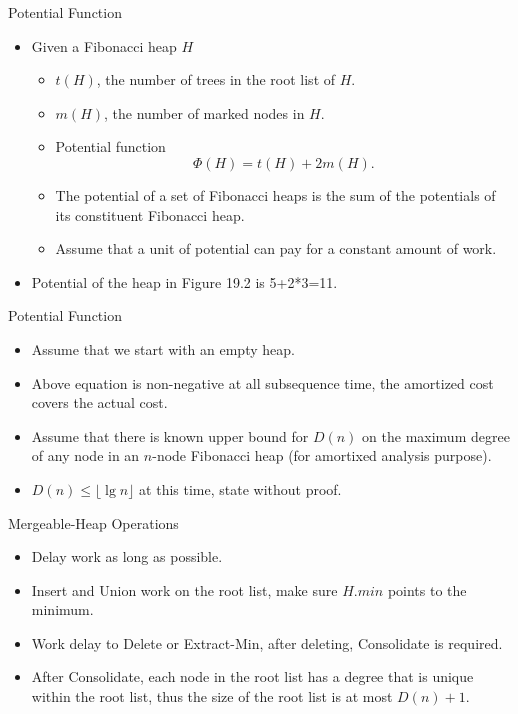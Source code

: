 \documentclass{beamer}
\begin{document}
\begin{frame}{Potential Function}
\begin{itemize}
\item Given a Fibonacci heap $H$
\begin{itemize}
\item $t(H)$, the number of trees in the root list of $H$.
\item $m(H)$, the number of marked nodes in $H$. 
\item Potential function \begin{equation}\Phi(H)=t(H)+2m(H). \label{1}\end{equation}
\item The potential of a set of Fibonacci heaps is the sum of the potentials of its constituent Fibonacci heap. 
\item Assume that a unit of potential can pay for a constant amount of work. 
\end{itemize}
\item Potential of the heap in Figure 19.2 is 5+2*3=11. 
\end{itemize}
\end{frame} 

\begin{frame}{Potential Function}
\vspace{0.5cm}
\begin{itemize}
\item Assume that we start with an empty heap.
\item Above equation is non-negative at all subsequence time, the amortized cost covers the actual cost. 
\item Assume that there is known upper bound for $D(n)$ on the maximum degree of any node in an $n$-node
Fibonacci heap (for amortixed analysis purpose). 
\item  $D(n)\le \lfloor \lg n\rfloor$ at this time, state without proof. 
\end{itemize}
\end{frame}


\begin{frame}{Mergeable-Heap Operations}
\begin{itemize}
\item Delay work as long as possible. 
\item {\sc Insert} and {\sc Union} work on the root list, make sure $H.min$ points to the minimum. 
\item Work delay to {\sc Delete} or {\sc Extract-Min}, after deleting, {\sc Consolidate} is required. 
\item After {\sc Consolidate}, each node in the root list has a degree that is unique within the root list, thus the size of the root list is at most $D(n)+1$.
\end{itemize}
\end{frame}
\end{document}
